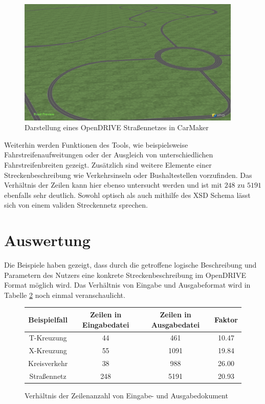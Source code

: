 \begin{figure}[H]
\flushleft
\includegraphics[width=0.95\textwidth]{fig/all.png}
\caption{Darstellung eines OpenDRIVE Straßennetzes in CarMaker}
\label{abb9}
\end{figure}

Weiterhin werden Funktionen des Tools, wie beispielsweise Fahrstreifenaufweitungen oder der Ausgleich von unterschiedlichen Fahrstreifenbreiten gezeigt. Zusätzlich sind weitere Elemente einer Streckenbeschreibung wie Verkehrsinseln oder Bushaltestellen vorzufinden. Das Verhältnis der Zeilen kann hier ebenso untersucht werden und ist mit \(248\) zu \(5191\) ebenfalls sehr deutlich. Sowohl optisch als auch mithilfe des XSD Schema lässt sich von einem validen Streckennetz sprechen.

\section{Auswertung}

Die Beispiele haben gezeigt, dass durch die getroffene logische Beschreibung und Parametern des Nutzers eine konkrete Streckenbeschreibung im OpenDRIVE Format möglich wird. Das Verhältnis von Eingabe und Ausgabeformat wird in Tabelle \ref{tab1} noch einmal veranschaulicht.
\begin{figure}
\centering
\begin{tabular}{c|c|c|c}
\toprule
\textbf{Beispielfall} & Zeilen in Eingabedatei & Zeilen in Ausgabedatei & Faktor \\
\midrule
T-Kreuzung & 44 & 461 & 10.47\\
X-Kreuzung & 55 & 1091 & 19.84\\
Kreisverkehr & 38 & 988 & 26.00\\
Straßennetz & 248 & 5191 & 20.93 \\
\bottomrule
\end{tabular}
\caption{Verhältnis der Zeilenanzahl von Eingabe- und Ausgabedokument}
\label{tab1}
\end{figure}

